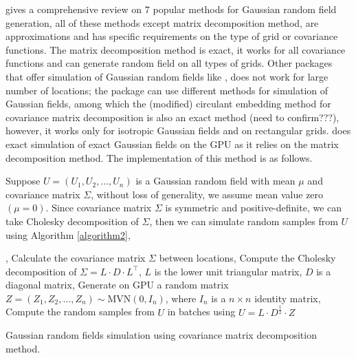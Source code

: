 \documentclass[article,nojss]{jss}\usepackage[]{graphicx}\usepackage[]{color}
\begin{document}
\cite{LiuandLi2019} gives a comprehensive review on 7 popular methods for Gaussian random field generation, %
all of these methods except matrix decomposition method, are approximations and has specific requirements on the type of grid or covariance functions. The matrix decomposition method is exact, it works for all covariance functions and can generate random field on all types of grids. Other  packages that offer simulation of Gaussian random fields like  \citep{geoR2001}, does not work for large number of locations; the  \citep{RandomFields2015,RandomFields2020} package can use different methods for simulation of Gaussian fields, among which the (modified) circulant embedding method \citep{Dietrich1997FastAE} for covariance matrix decomposition is also an exact method (need to confirm???), however, it works only for isotropic Gaussian fields and on rectangular grids.  does exact simulation of exact Gaussian fields on the GPU as it relies on the matrix decomposition method. The implementation of this method is as follows.


Suppose $U=(U_1, U_2, \dots, U_n)$ is a Gaussian random field with mean $\mu$ and covariance matrix $\Sigma$, without loss of generality, we assume mean value zero $(\mu = 0)$. Since covariance matrix $\Sigma$ is symmetric and positive-definite, we can take Cholesky decomposition of $\Sigma$, then we can simulate random samples from $U$ using Algorithm \ref{algorithm2},

\begin{algorithm}[ht]
, Calculate the covariance matrix $\Sigma$ between locations, Compute the Cholesky decomposition of $\Sigma = L \cdot D \cdot L^\top$, $L$ is the lower unit triangular matrix, $D$ is a diagonal matrix, Generate on GPU a random matrix $Z=(Z_1, Z_2, \dots, Z_n) \sim \text{MVN}(0,I_n)$, where $I_n$ is a $n \times n$ identity matrix, Compute the random samples from $U$ in batches using $U = L \cdot D^{\frac{1}{2}} \cdot Z$ \;
 \caption{Gaussian random fields simulation using covariance matrix decomposition method.}
 \label{algorithm2}
\end{algorithm}
\end{document}
